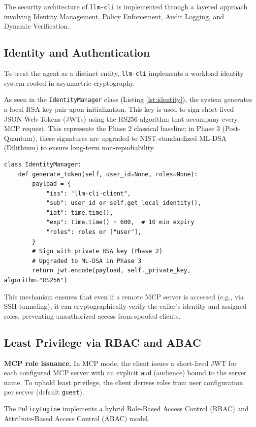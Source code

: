\documentclass[conference]{IEEEtran}
\begin{document}
The security architecture of \texttt{llm-cli} is implemented through a layered approach involving Identity Management, Policy Enforcement, Audit Logging, and Dynamic Verification.

\subsection{Identity and Authentication}
To treat the agent as a distinct entity, \texttt{llm-cli} implements a workload identity system rooted in asymmetric cryptography.

As seen in the \texttt{IdentityManager} class (Listing \ref{lst:identity}), the system generates a local RSA key pair upon initialization. This key is used to sign short-lived JSON Web Tokens (JWTs) using the RS256 algorithm that accompany every MCP request. This represents the Phase 2 classical baseline; in Phase 3 (Post-Quantum), these signatures are upgraded to NIST-standardized ML-DSA (Dilithium) to ensure long-term non-repudiability.

\begin{lstlisting}[caption={Identity Token Generation in identity.py}, label={lst:identity}]
class IdentityManager:
    def generate_token(self, user_id=None, roles=None):
        payload = {
            "iss": "llm-cli-client",
            "sub": user_id or self.get_local_identity(),
            "iat": time.time(),
            "exp": time.time() + 600,  # 10 min expiry
            "roles": roles or ["user"],
        }
        # Sign with private RSA key (Phase 2)
        # Upgraded to ML-DSA in Phase 3
        return jwt.encode(payload, self._private_key, algorithm="RS256")
\end{lstlisting}

This mechanism ensures that even if a remote MCP server is accessed (e.g., via SSH tunneling), it can cryptographically verify the caller's identity and assigned roles, preventing unauthorized access from spoofed clients.

\subsection{Least Privilege via RBAC and ABAC}
\textbf{MCP role issuance.} In MCP mode, the client issues a short-lived JWT for each configured MCP server with an explicit \texttt{aud} (audience) bound to the server name. To uphold least privilege, the client derives roles from user configuration per server (default \texttt{guest}).

The \texttt{PolicyEngine} implements a hybrid Role-Based Access Control (RBAC) and Attribute-Based Access Control (ABAC) model.
\end{document}
